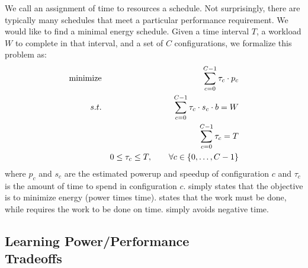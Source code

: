 We call an assignment of time to resources a schedule.  Not
surprisingly, there are typically many schedules that meet a
particular performance requirement.  We would like to find a minimal
energy schedule. Given a time interval $T$, a workload $W$ to
complete in that interval, and a set of $C$ configurations, we
formalize this problem as:
\begin{eqnarray}
  \minimize && \sum_{c=0}^{C-1} \tau_c \cdot p_c \label{eqn:power} \\
  \st %
  && \sum_{c=0}^{C-1} \tau_c \cdot s_c \cdot b =  W \label{eqn:work} \\
  && \sum_{c=0}^{C-1} \tau_c =  T \label{eqn:deadline} \\
  && 0 \le \tau_c \le T, \qquad \forall c \in \{0,\ldots,C-1\} \label{eqn:time}
\end{eqnarray}
where $p_c$ and $s_c$ are the estimated powerup and speedup of
configuration $c$ and $\tau_c$ is the amount of time to spend in
configuration $c$.   simply states that the objective is
to minimize energy (power times time).   states that the
work must be done, while  requires the work to be
done on time.   simply avoids negative time.


\subsection[Learning Power/Performance Tradeoffs]{Learning Power/Performance \\Tradeoffs}

